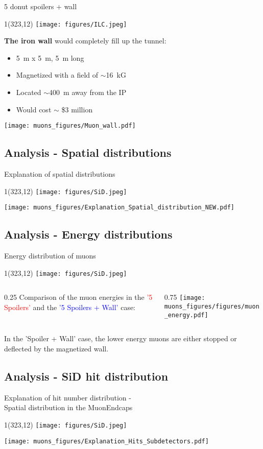 \documentclass[xcolor={dvipsnames}]{beamer}
\newcommand{\sidlogo}{
  \setlength{\TPHorizModule}{1pt}
  \setlength{\TPVertModule}{1pt}
  \begin{textblock}{1}(323,12)
   \texttt{[image: figures/SiD.jpeg]}
  \end{textblock}
  }
\newcommand{\ilclogo}{
  \setlength{\TPHorizModule}{1pt}
  \setlength{\TPVertModule}{1pt}
  \begin{textblock}{1}(323,12)
   \texttt{[image: figures/ILC.jpeg]}
  \end{textblock}
}
\begin{document}
\begin{frame}{5 donut spoilers + wall}
\ilclogo
\textbf{The iron wall} would completely fill up the tunnel:
\begin{itemize}
 \item \SI{5}{m} x \SI{5}{m}, \SI{5}{m} long
 \item Magnetized with a field of $\sim$\SI{16}{kG}
 \item Located $\sim$\SI{400}{m} away from the IP
 \item Would cost $\sim$ \$3 million
\end{itemize}
\begin{center}
\texttt{[image: muons\_figures/Muon\_wall.pdf]}
\end{center}
\end{frame}
\subsection{Analysis - Spatial distributions}
\begin{frame}{Explanation of spatial distributions}
\sidlogo
 \begin{center}
\texttt{[image: muons\_figures/Explanation\_Spatial\_distribution\_NEW.pdf]}
\end{center}
\end{frame}

\subsection{Analysis - Energy distributions}
\begin{frame}{Energy distribution of muons}
\sidlogo
\begin{columns}
 \begin{column}{0.25\textwidth}
 \small
  Comparison of the muon energies in the \textcolor{red}{'5 Spoilers'} and the \textcolor{blue}{'5 Spoilers + Wall'} case:
 \end{column}
 \begin{column}{0.75\textwidth}
  \texttt{[image: muons\_figures/figures/muon\_energy.pdf]}
 \end{column}
\end{columns}
In the 'Spoiler + Wall' case, the lower energy muons are either stopped or deflected by the magnetized wall.
\end{frame}

\subsection{Analysis - SiD hit distribution}
\begin{frame}{Explanation of hit number distribution -\\ \small Spatial distribution in the MuonEndcaps}
\sidlogo
 \begin{center}
\texttt{[image: muons\_figures/Explanation\_Hits\_Subdetectors.pdf]}
\end{center}
\end{frame}
\end{document}

